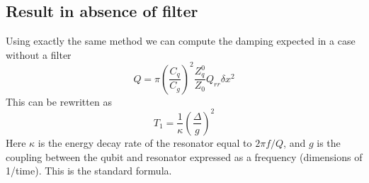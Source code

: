 \documentclass[english,aps,prl]{revtex4}
\begin{document}
\subsection{Result in absence of filter}

Using exactly the same method we can compute the damping expected in a case without a filter \begin{equation}
Q = \pi \left( \frac{C_q}{C_g} \right)^2 \frac{Z_q^0}{Z_0} Q_{rr} \delta x^2 \end{equation}
This can be rewritten as \begin{equation}
T_1 = \frac{1}{\kappa} \left( \frac{\Delta}{g} \right)^2 \end{equation}
Here $\kappa$ is the energy decay rate of the resonator equal to $2\pi f / Q$, and $g$ is the coupling between the qubit and resonator expressed as a frequency (dimensions of 1/time). This is the standard formula.
\end{document}
